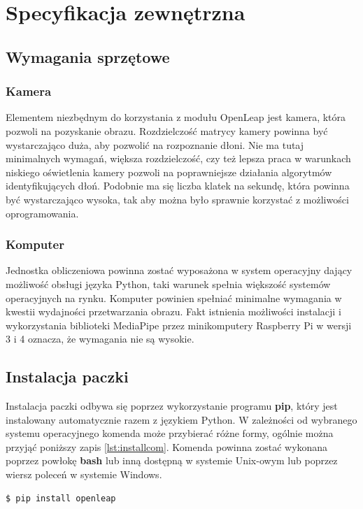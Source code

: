 \chapter{Specyfikacja zewnętrzna}

\section{Wymagania sprzętowe}
\subsection{Kamera}
\quad Elementem niezbędnym do korzystania z modułu OpenLeap jest kamera, która pozwoli na pozyskanie obrazu. Rozdzielczość matrycy kamery powinna być wystarczająco duża, aby pozwolić na rozpoznanie dłoni. Nie ma tutaj minimalnych wymagań, większa rozdzielczość, czy też lepsza praca w warunkach niskiego oświetlenia kamery pozwoli na poprawniejsze działania algorytmów identyfikujących dłoń. Podobnie ma się liczba klatek na sekundę, która powinna być wystarczająco wysoka, tak aby można było sprawnie korzystać z możliwości oprogramowania. 

\subsection{Komputer}
\quad Jednostka obliczeniowa powinna zostać wyposażona w system operacyjny dający możliwość obsługi języka Python, taki warunek spełnia większość systemów operacyjnych na rynku. Komputer powinien spełniać minimalne wymagania w kwestii wydajności przetwarzania obrazu. Fakt istnienia możliwości instalacji i wykorzystania biblioteki MediaPipe przez minikomputery Raspberry Pi w wersji 3 i 4 oznacza, że wymagania nie są wysokie. 

\section{Instalacja paczki}
\quad Instalacja paczki odbywa się poprzez wykorzystanie programu \textbf{pip}, który jest instalowany automatycznie razem z językiem Python. W zależności od wybranego systemu operacyjnego komenda może przybierać różne formy, ogólnie można przyjąć poniższy zapis \ref{lst:installcom}. Komenda powinna zostać wykonana poprzez powłokę \textbf{bash} lub inną dostępną w systemie Unix-owym lub poprzez wiersz poleceń w systemie Windows.\newline

\begin{lstlisting}[language=bash, style=command, label={lst:installcom}, caption={Instalacja paczki}]
    $ pip install openleap
\end{lstlisting}

